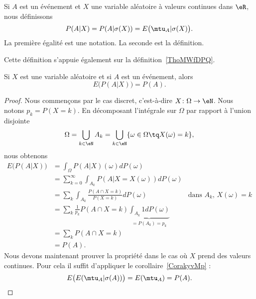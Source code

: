 \begin{definition}      \label{DEFooIUJMooBAVtMW}
    Si \( A\) est un événement et \( X\) une variable aléatoire à valeurs continues dans \( \eR\), nous définissons
    \begin{equation}
        P(A|X)=P(A|\sigma(X))=E\big( \mtu_A|\sigma(X) \big).
    \end{equation}
    La première égalité est une notation. La seconde est la définition.
\end{definition}
Cette définition s'appuie également sur la définition~\ref{ThoMWfDPQ}.

\begin{proposition}
    Si \( X\) est une variable aléatoire et si \( A\) est un événement, alors
    \begin{equation}
        E\big( P(A|X) \big)=P(A).
    \end{equation}
\end{proposition}

\begin{proof}
    Nous commençons par le cas discret, c'est-à-dire \( X\colon \Omega\to \eN\). Nous notons \( p_k=P(X=k)\). En décomposant l'intégrale sur \( \Omega\) par rapport à l'union disjointe
    \begin{equation}
        \Omega=\bigcup_{k\in \eN}A_k=\bigcup_{k\in \eN}\{ \omega\in\Omega \tq X(\omega)=k\},
    \end{equation}
    nous obtenons
    \begin{subequations}
        \begin{align}
            E\big( P(A|X) \big)&=\int_{\Omega}P(A|X)(\omega)dP(\omega)\\
            &=\sum_{k=0}^{\infty}\int_{A_k}P(A|X=X(\omega))dP(\omega)\\
            &=\sum_k\int_{A_k}\frac{ P(A\cap X=k) }{ P(X=k) }dP(\omega) & \text{dans } A_k\text{, } X(\omega)=k\\
            &=\sum_k\frac{1}{ p_k }P(A\cap X=k)\underbrace{\int_{A_k}1dP(\omega)}_{=P(A_k)=p_k}\\
            &=\sum_{k}P(A\cap X=k)\\
            &=P(A).
        \end{align}
    \end{subequations}
    Nous devons maintenant prouver la propriété dans le cas où \( X\) prend des valeurs continues. Pour cela il suffit d'appliquer le corollaire~\ref{CorakyvMp} :
    \begin{equation}
        E\big( E(\mtu_A|\sigma(A)) \big)=E(\mtu_A)=P(A).
    \end{equation}
\end{proof}

